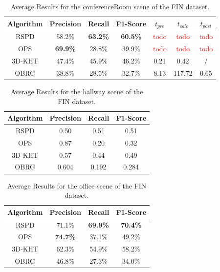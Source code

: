 \documentclass[main.tex]{subfiles}
\begin{document}
\begin{table}[]
    \centering
    \begin{tabular}{c|cccccc}
        Algorithm & Precision       & Recall          & F1-Score        & $t_{pre}$             & $t_{calc}$            & $t_{post}$            \\ \hline
        RSPD      & 58.2\%          & \textbf{63.2\%} & \textbf{60.5\%} & \textcolor{red}{todo} & \textcolor{red}{todo} & \textcolor{red}{todo} \\
        OPS       & \textbf{69.9\%} & 28.8\%          & 39.9\%          & \textcolor{red}{todo} & \textcolor{red}{todo} & \textcolor{red}{todo} \\
        3D-KHT    & 47.4\%          & 45.9\%          & 46.2\%          & 0.21                  & 0.42                  & /                     \\
        OBRG      & 38.8\%          & 28.5\%          & 32.7\%          & 8.13                  & 117.72                & 0.65
    \end{tabular}%
    \caption{Average Results for the conferenceRoom scene of the FIN dataset.}
    \label{tab:res-fin-conf}
\end{table}

\begin{table}[]
    \centering
    \begin{tabular}{c|ccc}
        Algorithm & Precision & Recall & F1-Score \\ \hline
        RSPD      & 0.50      & 0.51   & 0.51     \\
        OPS       & 0.87      & 0.20   & 0.32     \\
        3D-KHT    & 0.57      & 0.44   & 0.49     \\
        OBRG      & 0.604     & 0.192  & 0.284
    \end{tabular}%
    \caption{Average Results for the hallway scene of the FIN dataset.}
    \label{tab:res-fin-hall}
\end{table}

\begin{table}[]
    \centering
    \begin{tabular}{c|ccc}
        Algorithm & Precision       & Recall          & F1-Score        \\ \hline
        RSPD      & 71.1\%          & \textbf{69.9\%} & \textbf{70.4\%} \\
        OPS       & \textbf{74.7\%} & 37.1\%          & 49.2\%          \\
        3D-KHT    & 62.3\%          & 54.9\%          & 58.2\%          \\
        OBRG      & 46.8\%          & 27.3\%          & 34.0\%
    \end{tabular}
    \caption{Average Results for the office scene of the FIN dataset.}
    \label{tab:res-fin-off}
\end{table}
\end{document}
